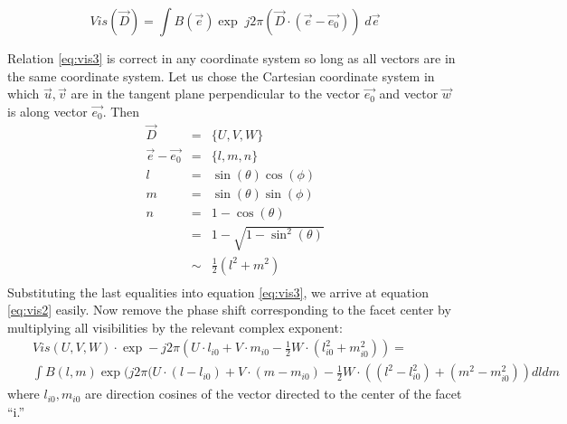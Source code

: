 \documentclass[twoside]{article}
\begin{document}
\begin{equation}
        Vis(\vec{D}) = \int B(\vec{e})
        \exp \; j 2\pi (\vec{D} \cdot ( \vec{e}-\vec{e_0})) \; d\vec{e}
        \label{eq:vis3}
\end{equation}

Relation \ref{eq:vis3} is correct in any coordinate system so long as
all vectors are in the same coordinate system.   Let us chose the
Cartesian coordinate system in which $\vec{u}, \vec{v}$ are in the
tangent plane perpendicular to the vector $\vec{e_0}$ and vector
$\vec{w}$ is along vector $\vec{e_0}$. Then
\begin{eqnarray*}
\vec{D}  & = &\{U,V,W\} \\
\vec{e} - \vec{e_0} & = & \{l,m,n\} \\
l & = & \sin(\theta) \cos(\phi) \\
m & = & \sin(\theta) \sin(\phi) \\
n & = & 1 - \cos(\theta) \\
  & = & 1 - \sqrt{1-\sin^2(\theta)} \\
  & \sim & \frac{1}{2}(l^2+m^2) \\
\end{eqnarray*}
Substituting the last equalities into equation \ref{eq:vis3}, we
arrive at equation \ref{eq:vis2} easily.  Now remove the phase shift
corresponding to the facet center by multiplying all visibilities by
the relevant complex exponent:
\begin{eqnarray}
 & &   Vis(U,V,W) \cdot  \exp -j 2\pi (U \cdot l_{i0} + V \cdot m_{i0}
       - \frac{1}{2} W \cdot (l_{i0}^2 + m_{i0}^2) )  =  \nonumber \\
 & &  \int B(l, m) \exp(j 2\pi (U \cdot (l-l_{i0}) + V \cdot
       (m-m_{i0}) - \frac{1}{2} W \cdot ((l^2-l_{i0}^2) +
       (m^2-m_{i0}^2) ) dl dm          \label{eq:vis4}
\end{eqnarray}
where $l_{i0}, m_{i0}$ are direction cosines of the vector directed to
the center of the facet ``i.''
\end{document}
